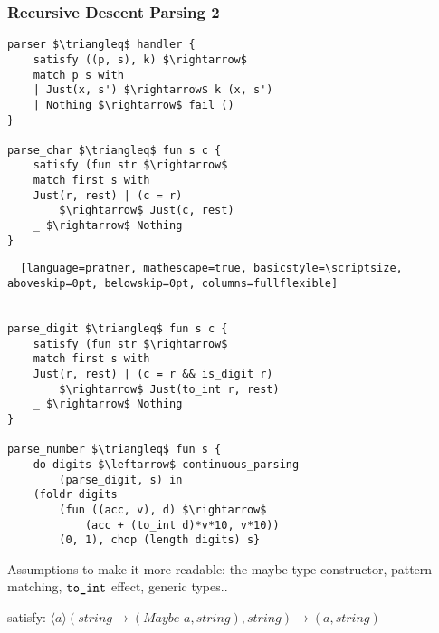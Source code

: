 \documentclass[t]{beamer}
\begin{document}
\begin{frame}[fragile]
	\frametitle{Recursive Descent Parsing 2}
	
\begin{multicols}{2}

\begin{lstlisting}[language=pratner, mathescape=true, basicstyle=\scriptsize, aboveskip=0pt, belowskip=0pt, columns=fullflexible]
parser $\triangleq$ handler {
    satisfy ((p, s), k) $\rightarrow$ 
    match p s with
    | Just(x, s') $\rightarrow$ k (x, s')
    | Nothing $\rightarrow$ fail ()
}

parse_char $\triangleq$ fun s c {
    satisfy (fun str $\rightarrow$ 
    match first s with
    Just(r, rest) | (c = r) 
        $\rightarrow$ Just(c, rest) 
    _ $\rightarrow$ Nothing
}

\end{lstlisting}

\columnbreak

\begin{lstlisting}	[language=pratner, mathescape=true, basicstyle=\scriptsize, aboveskip=0pt, belowskip=0pt, columns=fullflexible]


parse_digit $\triangleq$ fun s c {
    satisfy (fun str $\rightarrow$ 
    match first s with
    Just(r, rest) | (c = r && is_digit r) 
    	$\rightarrow$ Just(to_int r, rest) 
    _ $\rightarrow$ Nothing
}

parse_number $\triangleq$ fun s {
    do digits $\leftarrow$ continuous_parsing
        (parse_digit, s) in
    (foldr digits 
        (fun ((acc, v), d) $\rightarrow$ 
            (acc + (to_int d)*v*10, v*10))
        (0, 1), chop (length digits) s}

\end{lstlisting}
\end{multicols}

Assumptions to make it more readable: the maybe type constructor, pattern matching, $\verb|to_int|$ effect, \alert{generic types}..

satisfy: $\langle \textit{a} \rangle (\textit{string} \rightarrow (\textit{Maybe a}, \textit{string}), \textit{string}) \rightarrow (\textit{a}, \textit{string})$


\end{frame}
\end{document}
